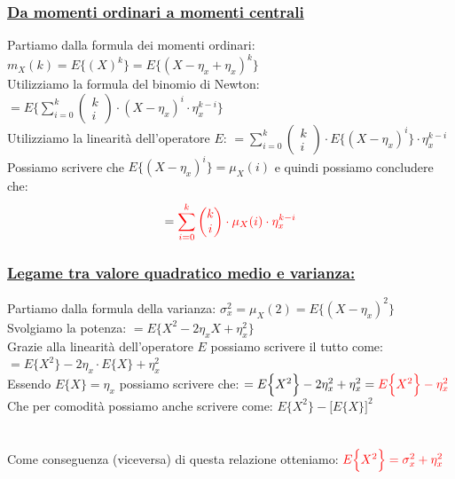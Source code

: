 \documentclass{article}
\begin{document}
\subsubsection{\underline{Da momenti ordinari a momenti centrali}}
Partiamo dalla formula dei momenti ordinari: $m_X(k) = E\Big\{ \left(X\right)^k\Big\} = E\Big\{ \left(X - \eta_x + \eta_x\right)^k\Big\}$ \\
Utilizziamo la formula del binomio di Newton: $= E\Bigg\{ \sum_{i=0}^{k} \left( \begin{matrix} k \\ i\end{matrix} \right) \cdot (X- \eta_x)^i \cdot \eta_x^{k-i}\Bigg\}$ \\
Utilizziamo la linearità dell’operatore $E$: $= \sum_{i=0}^{k} \left( \begin{matrix} k \\ i\end{matrix} \right) \cdot E\Big\{  (X-\eta_x)^i \Big\} \cdot \eta_x^{k-i}$ \\
Possiamo scrivere che $E\Big\{  (X-\eta_x)^i \Big \} = \mu_X(i)$ e quindi possiamo concludere che:
\[= \color{red} \sum_{i=0}^{k} \left( \begin{matrix} k \\ i\end{matrix} \right) \cdot \mu_X(i) \cdot \eta_x^{k-i}\]
\subsubsection{\underline{Legame tra valore quadratico medio e varianza:}}
Partiamo dalla formula della varianza: $\sigma_x^2 = \mu_X(2) = E\Big\{ \left(X-\eta_x\right)^2\Big\}$ \\
Svolgiamo la potenza: $= E\Big\{ X^2 -2\eta_xX + \eta_x^2\Big\}$ \\
Grazie alla linearità dell’operatore $E$ possiamo scrivere il tutto come: $= E\Big\{ X^2 \Big\} -2\eta_x \cdot E \Big\{X \Big\} + \eta_x^2$ \\
Essendo $E\Big\{X \Big\} = \eta_x$ possiamo scrivere che: $= E\Big\{ X^2 \Big\} -2\eta_x^2 + \eta_x^2 = \color{red} E\Big\{ X^2 \Big\} -\eta_x^2 $ \\
Che per comodità possiamo anche scrivere come: $E\Big\{ X^2 \Big\} - \big[E\big\{ X \big\} \big]^2$ \\ \\ \\
Come conseguenza (viceversa) di questa relazione otteniamo: $\color{red}E\Big\{ X^2 \Big\} = \sigma_x^2 + \eta_x^2$
\end{document}
